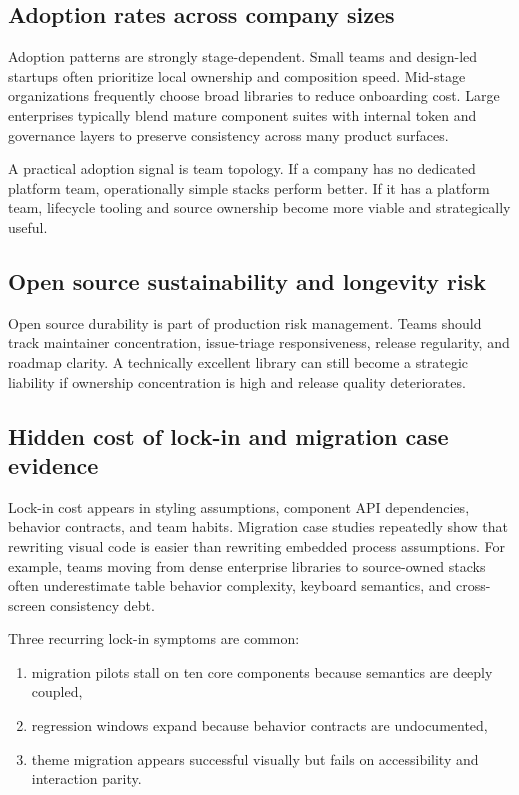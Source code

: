 \documentclass[11pt,twoside,a4paper]{article}
\begin{document}
\subsection{Adoption rates across company sizes}
Adoption patterns are strongly stage-dependent. Small teams and design-led startups often prioritize local ownership and composition speed. Mid-stage organizations frequently choose broad libraries to reduce onboarding cost. Large enterprises typically blend mature component suites with internal token and governance layers to preserve consistency across many product surfaces.

A practical adoption signal is team topology. If a company has no dedicated platform team, operationally simple stacks perform better. If it has a platform team, lifecycle tooling and source ownership become more viable and strategically useful.

\subsection{Open source sustainability and longevity risk}
Open source durability is part of production risk management. Teams should track maintainer concentration, issue-triage responsiveness, release regularity, and roadmap clarity. A technically excellent library can still become a strategic liability if ownership concentration is high and release quality deteriorates.

\subsection{Hidden cost of lock-in and migration case evidence}
Lock-in cost appears in styling assumptions, component API dependencies, behavior contracts, and team habits. Migration case studies repeatedly show that rewriting visual code is easier than rewriting embedded process assumptions. For example, teams moving from dense enterprise libraries to source-owned stacks often underestimate table behavior complexity, keyboard semantics, and cross-screen consistency debt.

Three recurring lock-in symptoms are common:

\begin{enumerate}[leftmargin=*, itemsep=0.3em]
  \item migration pilots stall on ten core components because semantics are deeply coupled,
  \item regression windows expand because behavior contracts are undocumented,
  \item theme migration appears successful visually but fails on accessibility and interaction parity.
\end{enumerate}
\end{document}

